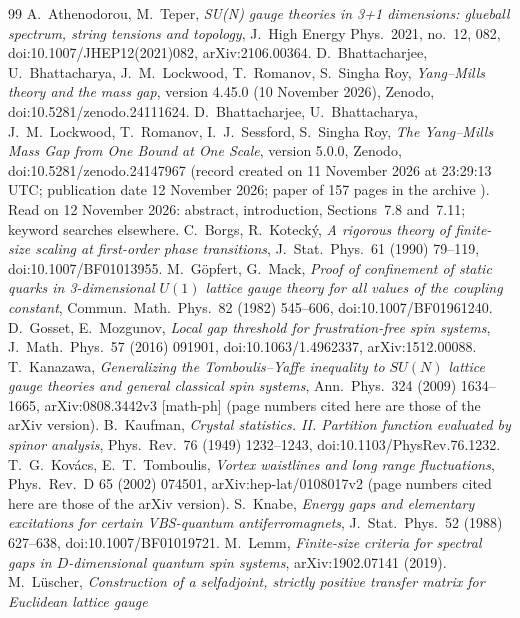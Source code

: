 \documentclass[11pt,a4paper]{article}
\theoremstyle{plain}
\theoremstyle{definition}
\theoremstyle{remark}
\numberwithin{equation}{section}
\begin{document}
{\small
\begin{thebibliography}{99}\setlength{\itemsep}{1pt}
 A.~Athenodorou, M.~Teper, \emph{SU(N) gauge theories in 3+1 dimensions: glueball spectrum, string tensions and
topology}, J.\ High Energy Phys.\ 2021, no.~12, 082, doi:10.1007/JHEP12(2021)082, arXiv:2106.00364.
 D.~Bhattacharjee, U.~Bhattacharya, J.~M.~Lockwood, T.~Romanov, S.~Singha Roy, \emph{Yang--Mills theory and the mass
gap}, version 4.45.0 (10 November 2026), Zenodo, doi:10.5281/zenodo.24111624.
 D.~Bhattacharjee, U.~Bhattacharya, J.~M.~Lockwood, T.~Romanov, I.~J.~Sessford, S.~Singha Roy, \emph{The Yang--Mills Mass
Gap from One Bound at One Scale}, version 5.0.0, Zenodo, doi:10.5281/zenodo.24147967 (record created on 11 November 2026 at 23:29:13 UTC;
publication date 12 November 2026; paper of 157 pages in the archive ). Read on 12 November 2026: abstract,
introduction, Sections~7.8 and~7.11; keyword searches elsewhere.
 C.~Borgs, R.~Koteck\'y, \emph{A rigorous theory of finite-size scaling at first-order phase transitions}, J.\ Stat.\
Phys.\ 61 (1990) 79--119, doi:10.1007/BF01013955.
 M.~G\"opfert, G.~Mack, \emph{Proof of confinement of static quarks in 3-dimensional $U(1)$ lattice gauge theory for all
values of the coupling constant}, Commun.\ Math.\ Phys.\ 82 (1982) 545--606, doi:10.1007/BF01961240.
\bibitem{GM16} D.~Gosset, E.~Mozgunov, \emph{Local gap threshold for frustration-free spin systems}, J.\ Math.\ Phys.\ 57 (2016)
091901, doi:10.1063/1.4962337, arXiv:1512.00088.
 T.~Kanazawa, \emph{Generalizing the Tomboulis--Yaffe inequality to $SU(N)$ lattice gauge theories and general classical spin systems}, Ann.\ Phys.\ 324 (2009) 1634--1665, arXiv:0808.3442v3 [math-ph] (page numbers cited here are those of the arXiv version).
\bibitem{Kau49} B.~Kaufman, \emph{Crystal statistics. II. Partition function evaluated by spinor analysis}, Phys.\ Rev.\ 76 (1949)
1232--1243, doi:10.1103/PhysRev.76.1232.
 T.~G.~Kov\'acs, E.~T.~Tomboulis, \emph{Vortex waistlines and long range fluctuations}, Phys.\ Rev.\ D 65 (2002) 074501, arXiv:hep-lat/0108017v2 (page numbers cited here are those of the arXiv version).
\bibitem{Kna88} S.~Knabe, \emph{Energy gaps and elementary excitations for certain VBS-quantum antiferromagnets}, J.\ Stat.\ Phys.\ 52
(1988) 627--638, doi:10.1007/BF01019721.
 M.~Lemm, \emph{Finite-size criteria for spectral gaps in $D$-dimensional quantum spin systems}, arXiv:1902.07141 (2019).
\bibitem{Lus77} M.~L\"uscher, \emph{Construction of a selfadjoint, strictly positive transfer matrix for Euclidean lattice gauge
}
\end{thebibliography}}
\end{document}
